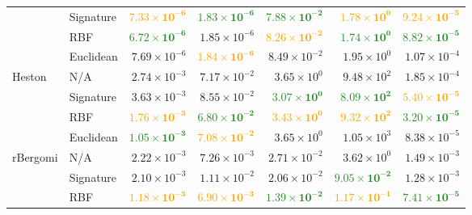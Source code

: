 \begin{table}[t]
{\begin{tabular}{llrrrrr}
 & Signature & \textcolor{Orange}{$\mathbf{7.33 \times 10^{-6}}$} & \textcolor{ForestGreen}{$\mathbf{1.83 \times 10^{-6}}$} & \textcolor{ForestGreen}{$\mathbf{7.88 \times 10^{-2}}$} & \textcolor{Orange}{$\mathbf{1.78 \times 10^{0}}$} & \textcolor{Orange}{$\mathbf{9.24 \times 10^{-5}}$} \\

 & RBF & \textcolor{ForestGreen}{$\mathbf{6.72 \times 10^{-6}}$} & $1.85 \times 10^{-6}$ & \textcolor{Orange}{$\mathbf{8.26 \times 10^{-2}}$} & \textcolor{ForestGreen}{$\mathbf{1.74 \times 10^{0}}$} & \textcolor{ForestGreen}{$\mathbf{8.82 \times 10^{-5}}$} \\

 & Euclidean & $7.69 \times 10^{-6}$ & \textcolor{Orange}{$\mathbf{1.84 \times 10^{-6}}$} & $8.49 \times 10^{-2}$ & $1.95 \times 10^{0}$ & $1.07 \times 10^{-4}$ \\
\midrule
\multirow{4}{*}{Heston}
 & N/A & $2.74 \times 10^{-3}$ & $7.17 \times 10^{-2}$ & $3.65 \times 10^{0}$ & $9.48 \times 10^{2}$ & $1.85 \times 10^{-4}$ \\

 & Signature & $3.63 \times 10^{-3}$ & $8.55 \times 10^{-2}$ & \textcolor{ForestGreen}{$\mathbf{3.07 \times 10^{0}}$} & \textcolor{ForestGreen}{$\mathbf{8.09 \times 10^{2}}$} & \textcolor{Orange}{$\mathbf{5.40 \times 10^{-5}}$} \\

 & RBF & \textcolor{Orange}{$\mathbf{1.76 \times 10^{-3}}$} & \textcolor{ForestGreen}{$\mathbf{6.80 \times 10^{-2}}$} & \textcolor{Orange}{$\mathbf{3.43 \times 10^{0}}$} & \textcolor{Orange}{$\mathbf{9.32 \times 10^{2}}$} & \textcolor{ForestGreen}{$\mathbf{3.20 \times 10^{-5}}$} \\

 & Euclidean & \textcolor{ForestGreen}{$\mathbf{1.05 \times 10^{-3}}$} & \textcolor{Orange}{$\mathbf{7.08 \times 10^{-2}}$} & $3.65 \times 10^{0}$ & $1.05 \times 10^{3}$ & $8.38 \times 10^{-5}$ \\
\midrule
\multirow{4}{*}{rBergomi}
 & N/A & $2.22 \times 10^{-3}$ & $7.26 \times 10^{-3}$ & $2.71 \times 10^{-2}$ & $3.62 \times 10^{0}$ & $1.49 \times 10^{-3}$ \\

 & Signature & $2.10 \times 10^{-3}$ & $1.11 \times 10^{-2}$ & $2.06 \times 10^{-2}$ & \textcolor{ForestGreen}{$\mathbf{9.05 \times 10^{-2}}$} & $1.28 \times 10^{-3}$ \\

 & RBF & \textcolor{Orange}{$\mathbf{1.18 \times 10^{-3}}$} & \textcolor{Orange}{$\mathbf{6.90 \times 10^{-3}}$} & \textcolor{ForestGreen}{$\mathbf{1.39 \times 10^{-2}}$} & \textcolor{Orange}{$\mathbf{1.17 \times 10^{-1}}$} & \textcolor{ForestGreen}{$\mathbf{7.41 \times 10^{-5}}$} \\


\end{tabular}}
\end{table}
